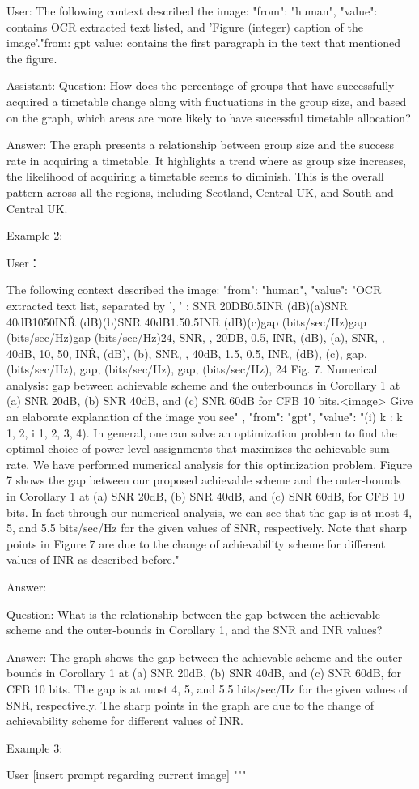 \documentclass{article}
\begin{document}
 User: The following context described the image:  "from": "human", "value": contains OCR extracted text listed, and 'Figure (integer) caption of the image'."from: gpt value: contains the first paragraph in the text that mentioned the figure.

 Assistant: Question: How does the percentage of groups that have successfully acquired a timetable change along with fluctuations in the group size, and based on the graph, which areas are more likely to have successful timetable allocation?

 Answer: The graph presents a relationship between group size and the success rate in acquiring a timetable. It highlights a trend where as group size increases, the likelihood of acquiring a timetable seems to diminish. This is the overall pattern across all the regions, including Scotland, Central UK, and South and Central UK.

 Example 2:

 User：

The following context described the image: "from": "human", "value": "OCR extracted text list, separated by ', ' : SNR  20DB0.5INR (dB)(a)SNR  40dB1050INŘ (dB)(b)SNR  40dB1.50.5INR (dB)(c)gap (bits/sec/Hz)gap (bits/sec/Hz)gap (bits/sec/Hz)24, SNR, , 20DB, 0.5, INR, (dB), (a), SNR, , 40dB, 10, 50, INŘ, (dB), (b), SNR, , 40dB, 1.5, 0.5, INR, (dB), (c), gap, (bits/sec/Hz), gap, (bits/sec/Hz), gap, (bits/sec/Hz), 24 Fig. 7. Numerical analysis: gap between achievable scheme and the outerbounds in Corollary 1 at (a) SNR  20dB, (b) SNR  40dB, and (c) SNR  60dB for CFB  10 bits.<image> Give an elaborate explanation of the image you see" ,  "from": "gpt", "value": "(i) k : k  1, 2, i  1, 2, 3, 4). In general, one can solve an optimization problem to find the optimal choice of power level assignments that maximizes the achievable sum-rate. We have performed numerical analysis for this optimization problem. Figure 7 shows the gap between our proposed achievable scheme and the outer-bounds in Corollary 1 at (a) SNR  20dB, (b) SNR  40dB, and (c) SNR  60dB, for CFB  10 bits. In fact through our numerical analysis, we can see that the gap is at most 4, 5, and 5.5 bits/sec/Hz for the given values of SNR, respectively. Note that sharp points in Figure 7 are due to the change of achievability scheme for different values of INR as described before." 

 Answer:

 Question: What is the relationship between the gap between the achievable scheme and the outer-bounds in Corollary 1, and the SNR and INR values?

 Answer: The graph shows the gap between the achievable scheme and the outer-bounds in Corollary 1 at (a) SNR  20dB, (b) SNR  40dB, and (c) SNR  60dB, for CFB  10 bits. The gap is at most 4, 5, and 5.5 bits/sec/Hz for the given values of SNR, respectively. The sharp points in the graph are due to the change of achievability scheme for different values of INR.

 Example 3:

 User [insert prompt regarding current image]
"""
\end{document}
